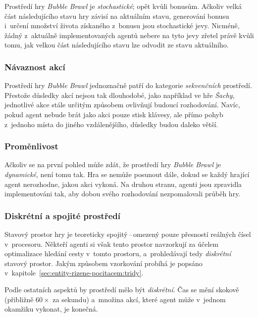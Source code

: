 Prostředí hry \emph{Bubble Brawl} je \emph{stochastické}; opět kvůli bonusům. Ačkoliv velká část následujícího stavu hry závisí na aktuálním stavu, generování bonusu i~určení množství života získaného z~bonusu jsou stochastické jevy. Nicméně, žádný z~aktuálně implementovaných agentů nebere na tyto jevy zřetel právě kvůli tomu, jak velkou část následujícího stavu lze odvodit ze stavu aktuálního.

\subsubsection*{Návaznost akcí}

Prostředí hry \emph{Bubble Brawl} jednoznačně patří do kategorie \emph{sekvenčních} prostředí. Přestože důsledky akcí nejsou tak dlouhodobé, jako například ve hře \emph{Šachy}, jednotlivé akce stále určitým způsobem ovlivňují budoucí rozhodování. Navíc, pokud agent nebude brát jako akci pouze stisk klávesy, ale přímo pohyb z~jednoho místa do jiného vzdálenějšího, důsledky budou daleko větší.

\subsubsection*{Proměnlivost}

Ačkoliv se na první pohled může zdát, že prostředí hry \emph{Bubble Brawl} je \emph{dynamické}, není tomu tak. Hra se nemůže posunout dále, dokud se každý hrající agent nerozhodne, jakou akci vykoná. Na druhou stranu, agenti jsou zpravidla implementováni tak, aby dobou svého rozhodování nezpomalovali průběh hry.

\subsubsection*{Diskrétní a spojité prostředí}

Stavový prostor hry je teoreticky spojitý\,--\,omezený pouze přesností reálných čísel v~procesoru. Někteří agenti si však tento prostor navzorkují \cite{MIT_OpenCourseWare:Incremental_Path_Planning} za účelem optimalizace hledání cesty v~tomto prostoru, a~prohledávají tedy \emph{diskrétní} stavový prostor. Jakým způsobem vzorkování probíhá je popsáno v~kapitole~\ref{sec:entity-rizene-pocitacem:tridy}.

Podle ostatních aspektů by prostředí mělo být \emph{diskrétní}. Čas se mění skokově (přibližně $60\times$ za sekundu) a~množina akcí, které agent může v~jednom okamžiku vykonat, je konečná.

